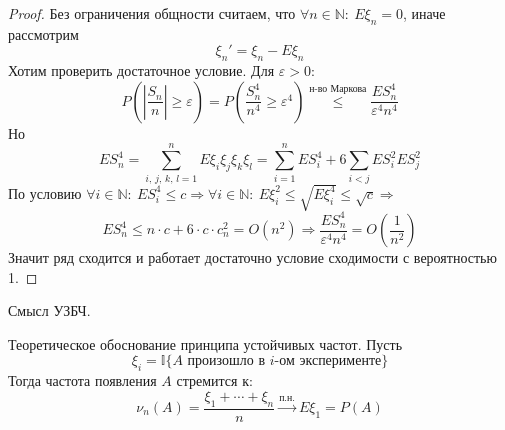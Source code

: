 \begin{proof}
	Без ограничения общности считаем, что $\forall n \in \mathbb{N}:\: E\xi_n = 0$, иначе рассмотрим
	\[\xi_n' = \xi_n - E\xi_n\]
	Хотим проверить достаточное условие. Для $\varepsilon > 0$:
	\[P\left(\left|\frac{S_n}{n}\right| \geq \varepsilon\right) = P\left(\frac{S_n^4}{n^4} \geq \varepsilon ^4\right) \stackrel{\text{н-во Маркова}}{\leq} \frac{ES_n^4}{\varepsilon^4n^4}\]
	Но
	\[ES_n^4 = \sum_{i,\,j,\,k,\,l = 1}^n E\xi_i\xi_j\xi_k\xi_l = \sum_{i = 1}^n ES_i^4 + 6\sum_{i < j}ES_i^2ES_j^2\]
	По условию $\forall i \in \mathbb{N}:\: ES_i^4 \leq c \Rightarrow \forall i \in \mathbb{N}:\: E\xi_i^2 \leq \sqrt{E\xi_i^4} \leq \sqrt{c} \Rightarrow$
	\[ES_n^4 \leq n\cdot c + 6\cdot c\cdot c_n^2 = O(n^2) \Rightarrow \frac{ES_n^4}{\varepsilon^4n^4} = O\left(\frac{1}{n^2}\right)\]
	Значит ряд сходится и работает достаточно условие сходимости с вероятностью 1.
\end{proof}

\begin{note}
	Смысл УЗБЧ.

	Теоретическое обоснование принципа устойчивых частот. Пусть
	\[\xi_i = \mathbb{I}\{A \text{ произошло в }i \text{-ом эксперименте}\}\]
	Тогда частота появления $A$ стремится к:
	\[\nu_n(A) = \frac{\xi_1 + \cdots + \xi_n}{n} \stackrel{\text{п.н.}}{\to} E\xi_1 = P(A)\]
\end{note}
